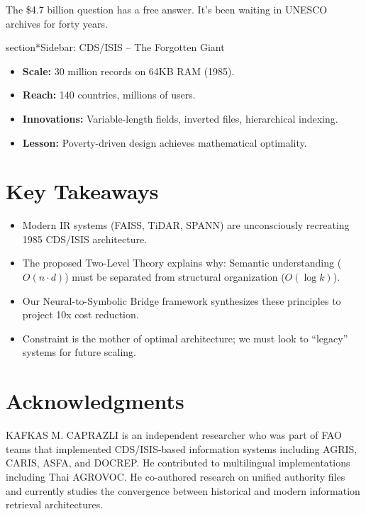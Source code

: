 \documentclass[manuscript,screen,review]{acmart}
\begin{document}
The \$4.7 billion question has a free answer. It's been waiting in UNESCO archives for forty years.

section*{Sidebar: CDS/ISIS -- The Forgotten Giant}
\begin{itemize}
\item \textbf{Scale:} 30 million records on 64KB RAM (1985).
\item \textbf{Reach:} 140 countries, millions of users.
\item \textbf{Innovations:} Variable-length fields, inverted files, hierarchical indexing.
\item \textbf{Lesson:} Poverty-driven design achieves mathematical optimality.
\end{itemize}

\section*{Key Takeaways}
\begin{itemize}
\item Modern IR systems (FAISS, TiDAR, SPANN) are unconsciously recreating 1985 CDS/ISIS architecture.
\item The proposed Two-Level Theory explains why: Semantic understanding ($O(n \cdot d)$) must be separated from structural organization ($O(\log k)$).
\item Our Neural-to-Symbolic Bridge framework synthesizes these principles to project 10x cost reduction.
\item Constraint is the mother of optimal architecture; we must look to ``legacy'' systems for future scaling.
\end{itemize}

\section*{Acknowledgments}
KAFKAS M. CAPRAZLI is an independent researcher who was part of FAO teams that implemented CDS/ISIS-based information systems including AGRIS, CARIS, ASFA, and DOCREP. He contributed to multilingual implementations including Thai AGROVOC. He co-authored research on unified authority files \cite{caprazli2003} and currently studies the convergence between historical and modern information retrieval architectures.



\end{document}
